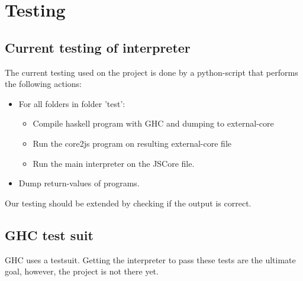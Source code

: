 
\chapter{Testing}
\label{chap:test}

\section{Current testing of interpreter}

The current testing used on the project is done by a python-script that performs
the following actions:

\begin{itemize}

\item For all folders in folder 'test':

\begin{itemize}

\item Compile haskell program with GHC and dumping to external-core

\item Run the core2js program on resulting external-core file

\item Run the main interpreter on the JSCore file.

\end{itemize}

\item Dump return-values of programs.

\end{itemize}

Our testing should be extended by checking if the output is correct.


\section{GHC test suit}

GHC uses a testsuit. Getting the interpreter to pass these tests are the
ultimate goal, however, the project is not there yet.
